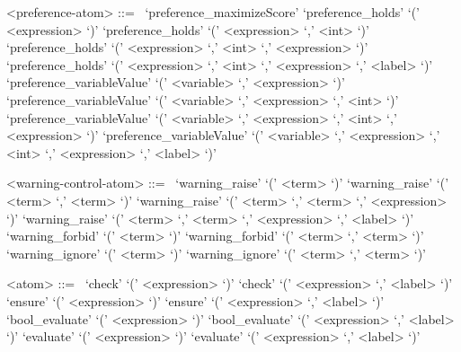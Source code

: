 \begin{grammar}
<preference-atom> ::=
~\alt `preference_maximizeScore'
\alt `preference_holds' `(' <expression> `)'
\alt `preference_holds' `(' <expression> `,' <int> `)'
\alt `preference_holds' `(' <expression> `,' <int> `,' <expression> `)'
\alt `preference_holds' `(' <expression> `,' <int> `,' <expression> `,' <label> `)'
\alt `preference_variableValue' `(' <variable> `,' <expression> `)'
\alt `preference_variableValue' `(' <variable> `,' <expression> `,' <int> `)'
\alt `preference_variableValue' `(' <variable> `,' <expression> `,' <int> `,' <expression> `)'
\alt `preference_variableValue' `(' <variable> `,' <expression> `,' <int> `,' <expression> `,' <label> `)'

<warning-control-atom> ::=
~\alt `warning_raise' `(' <term> `)'
\alt `warning_raise' `(' <term> `,' <term> `)'
\alt `warning_raise' `(' <term> `,' <term> `,' <expression> `)'
\alt `warning_raise' `(' <term> `,' <term> `,' <expression> `,' <label> `)'
\alt `warning_forbid' `(' <term> `)'
\alt `warning_forbid' `(' <term> `,' <term> `)'
\alt `warning_ignore' `(' <term> `)'
\alt `warning_ignore' `(' <term> `,' <term> `)'

<atom> ::=
~\alt `check' `(' <expression> `)'
\alt `check' `(' <expression> `,' <label> `)'
\alt `ensure' `(' <expression> `)'
\alt `ensure' `(' <expression> `,' <label> `)'
\alt `bool_evaluate' `(' <expression> `)'
\alt `bool_evaluate' `(' <expression> `,' <label> `)'
\alt `evaluate' `(' <expression> `)'
\alt `evaluate' `(' <expression> `,' <label> `)'
\end{grammar}

